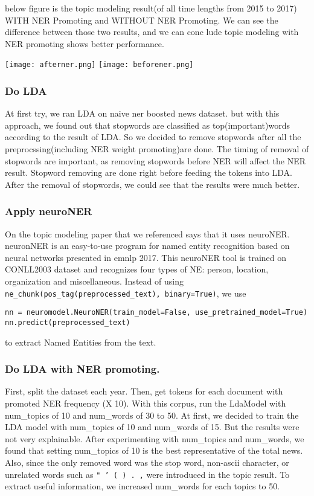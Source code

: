 below figure is the topic modeling result(of all time lengths from 2015 to 2017) WITH NER Promoting and WITHOUT NER Promoting. We can see the difference between those two results, and we can conc
lude topic modeling with NER promoting shows better performance.
\begin{figure*}[t]
    \centering
\texttt{[image: afterner.png]}
\texttt{[image: beforener.png]}
\end{figure*}
\subsubsection{Do LDA}
At first try, we ran LDA on naive ner boosted news dataset. but with this approach, we found out that stopwords are classified as top(important)words according to the result of LDA. So we decided to remove stopwords after all the preprocssing(including NER weight promoting)are done. The timing of removal of stopwords are important, as removing stopwords before NER will affect the NER result. Stopword removing are done right before feeding the tokens into LDA. After the removal of stopwords, we could see that the results were much better.

\subsubsection{Apply neuroNER} 
On the topic modeling paper that we referenced says that it uses neuroNER. neuronNER is an easy-to-use program for named entity recognition based on neural networks presented in emnlp 2017.  This neuroNER tool is trained on CONLL2003 dataset and recognizes four types
of NE: person, location, organization and miscellaneous. Instead of using \texttt{ne_chunk(pos_tag(preprocessed_text), binary=True)}, we use
\begin{verbatim}
nn = neuromodel.NeuroNER(train_model=False, use_pretrained_model=True)
nn.predict(preprocessed_text)
\end{verbatim}
to extract Named Entities from the text.


\subsubsection{Do LDA with NER promoting.}
First, split the dataset each year. Then, get tokens for each document with promoted NER frequency (X 10). With this corpus, run the LdaModel with num\_topics of 10 and num\_words of 30 to 50.
At first, we decided to train the LDA model with num\_topics of 10 and num\_words of 15. But the results were not very explainable. After experimenting with num\_topics and num\_words, we found that setting num\_topics of 10 is the best representative of the total news. Also, since the only removed word was the stop word, non-ascii character, or unrelated words such as \texttt{" \xec ' ( ) . ,} were introduced in the topic result. To extract useful information, we increased num\_words for each topics to 50.


